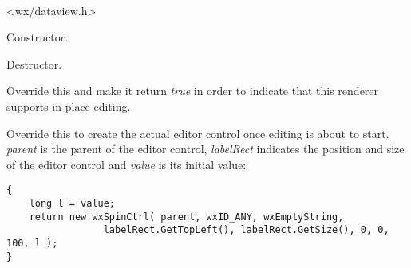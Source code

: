 
\\


<wx/dataview.h>



\label{wxdataviewcustomrendererwxdataviewcustomrenderer}


Constructor.

\label{wxdataviewcustomrendererdtor}


Destructor.


\label{wxdataviewcustomrendererhaseditorctrl}


Override this and make it return {\it true} in order to
indicate that this renderer supports in-place editing.

\label{wxdataviewcustomrenderercreateeditorctrl}


Override this to create the actual editor control once editing
is about to start. {\it parent} is the parent of the editor
control, {\it labelRect} indicates the position and
size of the editor control and {\it value} is its initial value:

{\small
\begin{verbatim}
{ 
    long l = value;
    return new wxSpinCtrl( parent, wxID_ANY, wxEmptyString, 
                 labelRect.GetTopLeft(), labelRect.GetSize(), 0, 0, 100, l );
}
\end{verbatim}
}

\label{wxdataviewcustomrenderergetvaluefromeditorctrl}

